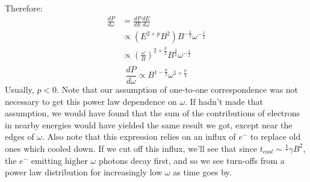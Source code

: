 \documentclass{article}
\def\inv#1{\frac1{#1}}
\def\hf{\frac12}
\def\inv#1{{\frac{1}{}#1}}
\def\hf{\frac12}
\begin{document}
Therefore:
$$\begin{aligned}\frac{dP}{ d\omega}&=\frac{dP}{ dE}\frac{dE}{ d\omega}\\ 
&\propto(E^{2+p}B^2)B^{-\hf}\omega^{-\hf}\\ 
&\propto\left(\frac{\omega}{ B}\right)^{2+\frac{p}{2}}B^\frac{3}{2}\omega^{-\hf}\\ \end{aligned}$$
$$\boxed{\frac{dP}{ d\omega}\propto B^{1-\frac{p}{2}}\omega^{1+\frac{p}{2}}}$$
Usually, $p<0$.  Note that our assumption of one-to-one correspondence was
not necessary to get this power law dependence on $\omega$.  If hadn't made
that assumption, we would have found that the sum of the contributions of
electrons in nearby energies would have yielded the same result we got, except
near the edges of $\omega$.  Also note that this expression relies on an
influx of $e^-$ to replace old ones which cooled down.  If we cut off this
influx, we'll see that since $t_{cool}\sim\inv{\gamma B^2}$, the $e^-$ emitting
higher $\omega$ photons decay first, and so we see turn-offs from a power law
distribution for increasingly low $\omega$ as time goes by.\par
\end{document}
